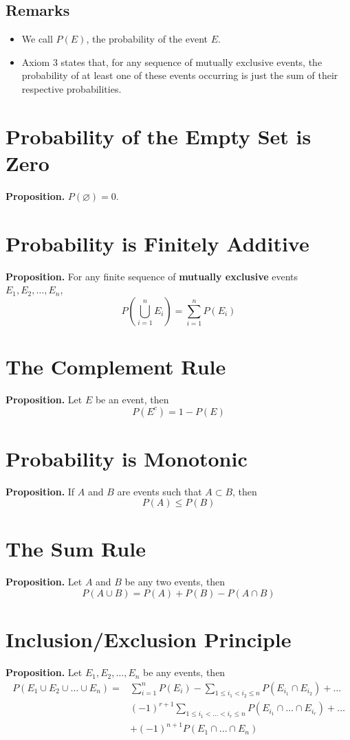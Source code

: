 \documentclass[../st2131_notes.tex]{subfiles}
\begin{document}
\subsection{Remarks}
\begin{itemize}
	\item We call \(P(E)\), the probability of the event \(E\).
	\item Axiom 3 states that, for any sequence of mutually exclusive events, the probability of at least one of these events occurring is just the sum of their respective probabilities.
\end{itemize}

\section{Probability of the Empty Set is Zero}
\textbf{Proposition.} \(P(\varnothing)=0\).

\section{Probability is Finitely Additive}
\textbf{Proposition.} For any finite sequence of \textbf{mutually exclusive} events \(E_1,E_2,\ldots,E_n\),
\[P\left(\bigcup_{i=1}^n E_i\right)=\sum_{i=1}^n P(E_i)\]

\section{The Complement Rule}
\textbf{Proposition.} Let \(E\) be an event, then
\[P(E^c)=1-P(E)\]

\section{Probability is Monotonic}
\textbf{Proposition.} If \(A\) and \(B\) are events such that \(A\subset B\), then
\[P(A)\leq P(B)\]

\section{The Sum Rule}
\textbf{Proposition.} Let \(A\) and \(B\) be any two events, then
\[P(A\cup B)=P(A)+P(B)-P(A\cap B)\]

\section{Inclusion/Exclusion Principle}
\textbf{Proposition.} Let \(E_1,E_2,\ldots,E_n\) be any events, then
\begin{align*}
P(E_1\cup E_2\cup\ldots\cup E_n)=&\sum_{i=1}^nP(E_i)-\sum_{1\leq i_1<i_2\leq n}P(E_{i_1}\cap E_{i_2})+\ldots \\
&(-1)^{r+1}\sum_{1\leq i_1<\ldots<i_r\leq n}P(E_{i_1}\cap\ldots\cap E_{i_r})+\ldots\\
&+(-1)^{n+1}P(E_1\cap\ldots\cap E_n)
\end{align*}
\end{document}
